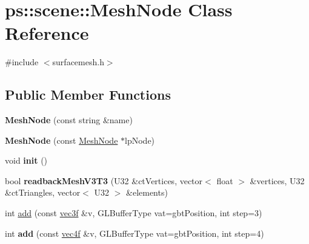 \hypertarget{classps_1_1scene_1_1MeshNode}{}\section{ps\+:\+:scene\+:\+:Mesh\+Node Class Reference}
\label{classps_1_1scene_1_1MeshNode}


{\ttfamily \#include $<$surfacemesh.\+h$>$}

\subsection*{Public Member Functions}
\begin{DoxyCompactItemize}
\item 
\hypertarget{classps_1_1scene_1_1MeshNode_a1ffab8f4eebb6e487b30e43099752c99}{}{\bfseries Mesh\+Node} (const string \&name)\label{classps_1_1scene_1_1MeshNode_a1ffab8f4eebb6e487b30e43099752c99}

\item 
\hypertarget{classps_1_1scene_1_1MeshNode_a08a8a5caa8021bcc68b14de1d7ceeaf5}{}{\bfseries Mesh\+Node} (const \hyperlink{classps_1_1scene_1_1MeshNode}{Mesh\+Node} $\ast$lp\+Node)\label{classps_1_1scene_1_1MeshNode_a08a8a5caa8021bcc68b14de1d7ceeaf5}

\item 
\hypertarget{classps_1_1scene_1_1MeshNode_af3acd683b56c5aec14ebf018517eba48}{}void {\bfseries init} ()\label{classps_1_1scene_1_1MeshNode_af3acd683b56c5aec14ebf018517eba48}

\item 
\hypertarget{classps_1_1scene_1_1MeshNode_a83f1d8c02d7e9d0608ff67a6b213c15f}{}bool {\bfseries readback\+Mesh\+V3\+T3} (U32 \&ct\+Vertices, vector$<$ float $>$ \&vertices, U32 \&ct\+Triangles, vector$<$ U32 $>$ \&elements)\label{classps_1_1scene_1_1MeshNode_a83f1d8c02d7e9d0608ff67a6b213c15f}

\item 
int \hyperlink{classps_1_1scene_1_1MeshNode_a2a8293f22a8add94d330daff6bc2bd7b}{add} (const \hyperlink{classps_1_1base_1_1Vec3}{vec3f} \&v, G\+L\+Buffer\+Type vat=gbt\+Position, int step=3)
\item 
\hypertarget{classps_1_1scene_1_1MeshNode_ae646caed0e8b1bfeb41a2b832a83c8b7}{}int {\bfseries add} (const \hyperlink{classps_1_1base_1_1Vec4}{vec4f} \&v, G\+L\+Buffer\+Type vat=gbt\+Position, int step=4)\label{classps_1_1scene_1_1MeshNode_ae646caed0e8b1bfeb41a2b832a83c8b7}


\end{DoxyCompactItemize}
